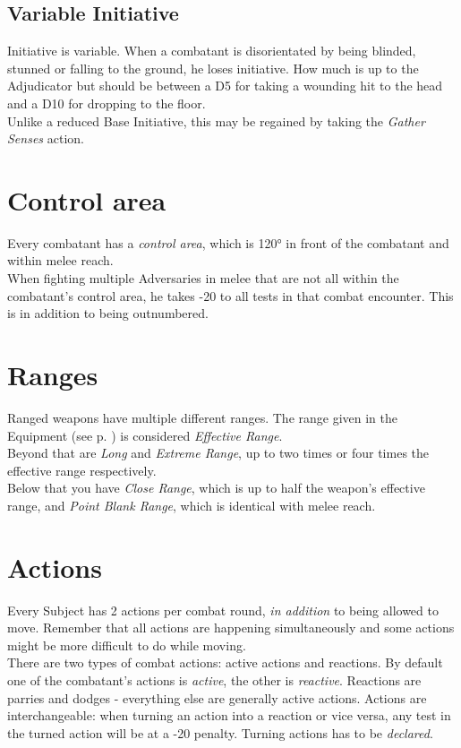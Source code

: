 \subsection{Variable Initiative}
\label{subsec:variableini}
Initiative is variable.
When a combatant is disorientated by
	being blinded, stunned or falling to the ground,
	he loses initiative.
How much is up to the Adjudicator but should be between
	a D5 for taking a wounding hit to the head
	and a D10 for dropping to the floor.
\\%
Unlike a reduced Base Initiative, this may be regained by taking the \emph{Gather Senses} action.
\section{Control area}
Every combatant has a \emph{control area},
which is 120° in front of the combatant
and within melee reach.
\\%
When fighting multiple Adversaries in melee
	that are not all within the combatant's control area,
	he takes -20 to all tests in that combat encounter.
This is in addition to being outnumbered.
\section{Ranges}
Ranged weapons have multiple different ranges.
The range given in the Equipment (see p. \pageref{sec:rangedweapons}) is considered \emph{Effective Range}.
\\%
Beyond that are \emph{Long} and \emph{Extreme Range},
	up to two times or four times the effective range respectively.
\\%
Below that you have \emph{Close Range},
which is up to half the weapon's effective range,
and \emph{Point Blank Range},
which is identical with melee reach.
\section{Actions}
Every Subject has 2 actions per combat round,
	\emph{in addition} to being allowed to move.
Remember that all actions are happening simultaneously
	and some actions might be more difficult to do while moving.
\\%
There are two types of combat actions: active actions and reactions.
By default one of the combatant’s actions is \emph{active}, the other is \emph{reactive}.
Reactions are parries and dodges - everything else are generally active actions.
Actions are interchangeable:
	when turning an action into a reaction or vice versa,
	any test in the turned action will be at a -20 penalty.
Turning actions has to be \emph{declared}.
